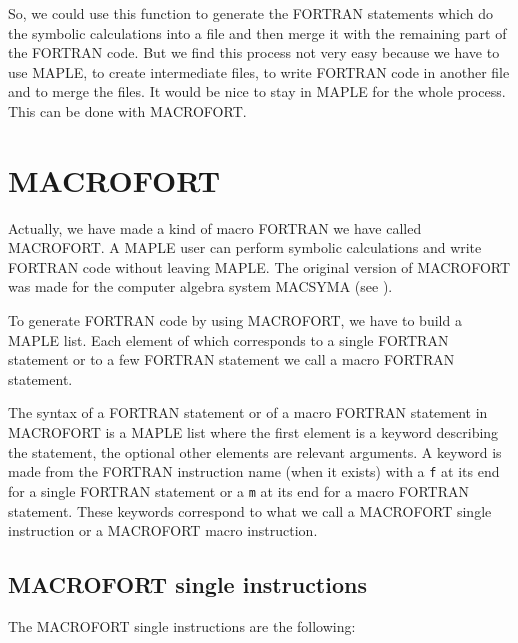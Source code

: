 So, we could use this function to generate the FORTRAN statements which do
the symbolic calculations into a file and then merge it with the remaining part
of the FORTRAN code. 
But we find this process not very easy because we have to use MAPLE,
to create intermediate files, to write FORTRAN code in another file and to
merge the files. It would be nice to stay in MAPLE for the whole process.
This can be done with MACROFORT.

\section{MACROFORT}
\label{macrofort}

Actually, we have made a kind of macro FORTRAN we have called MACROFORT. A
MAPLE user can perform symbolic calculations and write FORTRAN code without
leaving MAPLE. 
The original version of MACROFORT was made for the computer algebra system
MACSYMA (see \cite{macsyma}).

To generate FORTRAN code by using MACROFORT, we have to build a MAPLE list.
Each element of which corresponds to a single FORTRAN statement or to 
a few FORTRAN statement we call a macro FORTRAN statement.

The syntax of a FORTRAN statement or of a macro FORTRAN statement in 
MACROFORT is a MAPLE list where the first element is a keyword describing
the statement, the optional other elements are relevant arguments.
A keyword is made from the FORTRAN instruction name (when it exists)
with a {\tt f} at its end for a single FORTRAN statement or a {\tt m}
at its end for a macro FORTRAN statement. These keywords correspond to
what we call a MACROFORT single instruction or a MACROFORT macro instruction.

\subsection{MACROFORT single instructions}

The MACROFORT single instructions are the following:

